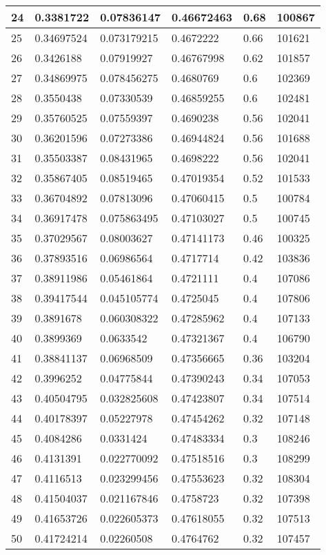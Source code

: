 \begin{longtable}{|l|l|l|l|l|l|}
24 & 0.3381722 & 0.07836147 & 0.46672463 & 0.68 & 100867 \\ \hline 
25 & 0.34697524 & 0.073179215 & 0.4672222 & 0.66 & 101621 \\ \hline 
26 & 0.3426188 & 0.07919927 & 0.46767998 & 0.62 & 101857 \\ \hline 
27 & 0.34869975 & 0.078456275 & 0.4680769 & 0.6 & 102369 \\ \hline 
28 & 0.3550438 & 0.07330539 & 0.46859255 & 0.6 & 102481 \\ \hline 
29 & 0.35760525 & 0.07559397 & 0.4690238 & 0.56 & 102041 \\ \hline 
30 & 0.36201596 & 0.07273386 & 0.46944824 & 0.56 & 101688 \\ \hline 
31 & 0.35503387 & 0.08431965 & 0.4698222 & 0.56 & 102041 \\ \hline 
32 & 0.35867405 & 0.08519465 & 0.47019354 & 0.52 & 101533 \\ \hline 
33 & 0.36704892 & 0.07813096 & 0.47060415 & 0.5 & 100784 \\ \hline 
34 & 0.36917478 & 0.075863495 & 0.47103027 & 0.5 & 100745 \\ \hline 
35 & 0.37029567 & 0.08003627 & 0.47141173 & 0.46 & 100325 \\ \hline 
36 & 0.37893516 & 0.06986564 & 0.4717714 & 0.42 & 103836 \\ \hline 
37 & 0.38911986 & 0.05461864 & 0.4721111 & 0.4 & 107086 \\ \hline 
38 & 0.39417544 & 0.045105774 & 0.4725045 & 0.4 & 107806 \\ \hline 
39 & 0.3891678 & 0.060308322 & 0.47285962 & 0.4 & 107133 \\ \hline 
40 & 0.3899369 & 0.0633542 & 0.47321367 & 0.4 & 106790 \\ \hline 
41 & 0.38841137 & 0.06968509 & 0.47356665 & 0.36 & 103204 \\ \hline 
42 & 0.3996252 & 0.04775844 & 0.47390243 & 0.34 & 107053 \\ \hline 
43 & 0.40504795 & 0.032825608 & 0.47423807 & 0.34 & 107514 \\ \hline 
44 & 0.40178397 & 0.05227978 & 0.47454262 & 0.32 & 107148 \\ \hline 
45 & 0.4084286 & 0.0331424 & 0.47483334 & 0.3 & 108246 \\ \hline 
46 & 0.4131391 & 0.022770092 & 0.47518516 & 0.3 & 108299 \\ \hline 
47 & 0.4116513 & 0.023299456 & 0.47553623 & 0.32 & 108304 \\ \hline 
48 & 0.41504037 & 0.021167846 & 0.4758723 & 0.32 & 107398 \\ \hline 
49 & 0.41653726 & 0.022605373 & 0.47618055 & 0.32 & 107513 \\ \hline 
50 & 0.41724214 & 0.02260508 & 0.4764762 & 0.32 & 107457 \\ \hline 
\end{longtable}